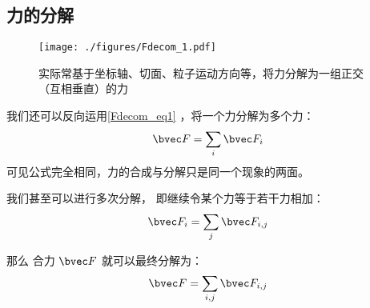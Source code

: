 \subsection{力的分解}
\begin{figure}[ht]
\centering
\texttt{[image: ./figures/Fdecom\_1.pdf]}
\caption{实际常基于坐标轴、切面、粒子运动方向等，将力分解为一组正交（互相垂直）的力} \label{Fdecom_fig1}
\end{figure}
我们还可以反向运用\autoref{Fdecom_eq1} ，将一个力分解为多个力：
\begin{equation}
\bvec F = \sum_i \bvec F_{i}
\end{equation}
可见公式完全相同，力的合成与分解只是同一个现象的两面。

我们甚至可以进行多次分解， 即继续令某个力等于若干力相加：
\begin{equation}
\bvec F_i = \sum_j \bvec F_{i,j}
\end{equation}

那么 合力 $\bvec F$ 就可以最终分解为：
\begin{equation}
\bvec F = \sum_{i,j} \bvec F_{i,j}
\end{equation}



